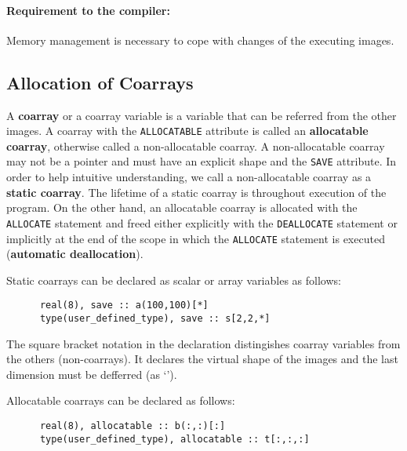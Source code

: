 
\paragraph{Requirement to the compiler:}
Memory management is necessary to cope with changes of the executing images.



\subsection{Allocation of Coarrays}

A {\bf coarray} or a coarray variable is a variable that can be referred from the other images. 
A coarray with the {\tt ALLOCATABLE} attribute is called an {\bf allocatable coarray}, 
otherwise called a non-allocatable coarray. A non-allocatable coarray may not be a pointer 
and must have an explicit shape and the {\tt SAVE} attribute. 
In order to help intuitive understanding, we call a non-allocatable coarray as 
a {\bf static coarray}. The lifetime of a static coarray is throughout execution of the program. 
On the other hand, an allocatable coarray is allocated with the {\tt ALLOCATE} statement and 
freed either explicitly with the {\tt DEALLOCATE} statement or implicitly at the end of the scope
in which the {\tt ALLOCATE} statement is executed ({\bf automatic deallocation}).

Static coarrays can be declared as scalar or array variables as follows:
\begin{verbatim}
      real(8), save :: a(100,100)[*]
      type(user_defined_type), save :: s[2,2,*]
\end{verbatim}

The square bracket notation in the declaration distingishes coarray variables from 
the others (non-coarrays). It declares the virtual shape of the images and the last 
dimension must be defferred (as `{\tt *}').

Allocatable coarrays can be declared as follows:
\begin{verbatim}
      real(8), allocatable :: b(:,:)[:]
      type(user_defined_type), allocatable :: t[:,:,:]
\end{verbatim}


